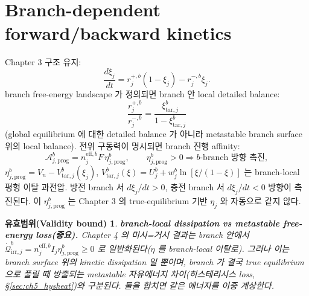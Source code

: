 \documentclass[11pt,a4paper]{article}
\newtheorem*{boundbox}{유효범위(Validity bound)}
\newcommand{\eff}{\mathrm{eff}}
\newcommand{\irr}{\mathrm{irr}}
\newcommand{\prog}{\mathrm{prog}}
\newcommand{\tar}{\mathrm{tar}}
\begin{document}
\section{Branch-dependent forward/backward kinetics}\label{sec:ch5_kinetics}
Chapter 3 구조 유지:
\begin{equation}
\frac{d\xi_j}{dt}=r_j^{+,b}(1-\xi_j)-r_j^{-,b}\xi_j.
\label{eq:ch5_branch_fb}
\end{equation}
branch free-energy landscape 가 정의되면 branch 안 local detailed balance:
\begin{equation}
\frac{r_j^{+,b}}{r_j^{-,b}}=\frac{\xi_{\tar,j}^b}{1-\xi_{\tar,j}^b}
\label{eq:ch5_branch_db}
\end{equation}
(global equilibrium 에 대한 detailed balance 가 아니라 metastable branch surface 위의 local balance). 전위
구동력이 명시되면 branch 진행 affinity:
\begin{equation}
\mathcal A_{j,\prog}^b=n_j^{\eff,b}F\,\eta_{j,\prog}^b,\qquad \eta_{j,\prog}^b>0\Rightarrow b\text{-branch 방향 촉진},
\label{eq:ch5_branch_affinity}
\end{equation}
$\eta_{j,\prog}^b=V_n-V_{\tar,j}^b(\xi_j)$, $V_{\tar,j}^b(\xi)=U_j^b+w_j^b\ln[\xi/(1-\xi)]$ 는 branch-local
평형 이탈 과전압. 방전 branch 서 $d\xi_j/dt>0$, 충전 branch 서 $d\xi_j/dt<0$ 방향이 촉진된다. 이
$\eta_{j,\prog}^b$ 는 Chapter 3 의 true-equilibrium 기반 $\eta_j$ 와 자동으로 같지 않다.
\begin{boundbox}
\textbf{branch-local dissipation vs metastable free-energy loss(중요).} Chapter 4 의 미시=거시 결과는 branch
안에서 $\dot{\mathcal Q}_{\irr,j}^b=n_j^{\eff,b}I_j\eta_{j,\prog}^b\ge0$ 로 일반화된다($\eta$ 를 branch-local
이탈로). 그러나 이는 \emph{branch surface 위의 kinetic dissipation} 일 뿐이며, branch 가 결국 true
equilibrium 으로 풀릴 때 방출되는 \emph{metastable 자유에너지 차이}(히스테리시스 loss, \S\ref{sec:ch5_hysheat})와
구분된다. 둘을 합치면 같은 에너지를 이중 계상한다.
\end{boundbox}

\end{document}

